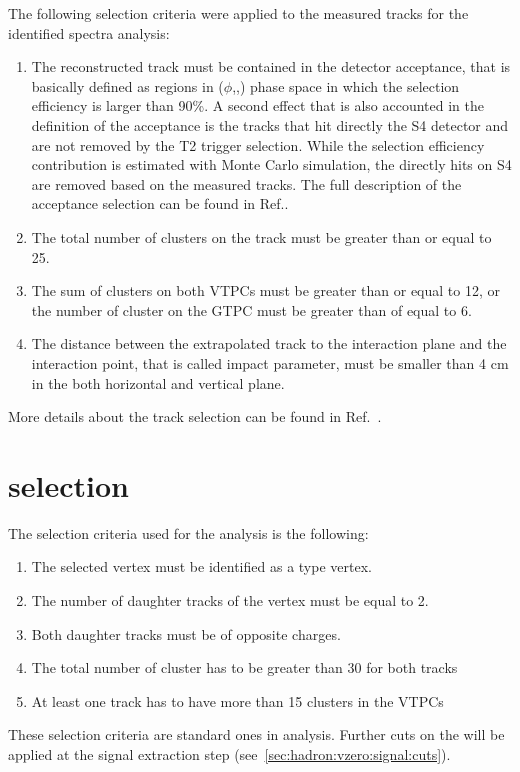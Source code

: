 The following selection criteria were applied to the measured tracks
for the identified spectra analysis:
\begin{enumerate}[label=(\roman*)]
\item The reconstructed track must be contained in the detector acceptance,
  that is basically defined as regions in ($\phi$,\pp,\pT) phase space
  in which the selection efficiency is larger than 90\%. A second effect
  that is also accounted in the definition of the acceptance is the tracks that
  hit directly the S4 detector and are not removed by the T2 trigger selection.
  While the selection efficiency contribution is estimated with Monte Carlo simulation,
  the directly hits on S4 are removed based on the measured tracks.
  The full description of the acceptance selection can be found in Ref.\cite{MartinThesis}.
\item The total number of clusters on the track must be greater than or equal to 25.
\item The sum of clusters on both VTPCs must be greater than or equal to 12, or
  the number of cluster on the GTPC must be greater than of equal to 6.
\item The distance between the extrapolated track to the interaction plane and the
  interaction point, that is called impact parameter, must be smaller than 4 cm
  in the both horizontal and vertical plane.
\end{enumerate}
More details about the track selection
can be found in Ref.~\cite{MartinThesis}.



\section{\vzero selection}
\label{sec:hadron:vzeroselection}


The \vzero selection criteria used for the \vzero analysis
is the following:
\begin{enumerate}[label=(\roman*)]
\item The selected vertex must be identified as a \vzero type vertex.
\item The number of daughter tracks of the vertex must be equal to 2.
\item Both daughter tracks must be of opposite charges.
\item The total number of cluster has to be greater than 30 for both tracks
\item At least one track has to have more than 15 clusters in the VTPCs
\end{enumerate}
These selection criteria are standard ones in \NASixtyOne analysis.
Further cuts on the \vzeros will be applied at the signal extraction
step (see~\cref{sec:hadron:vzero:signal:cuts}).


